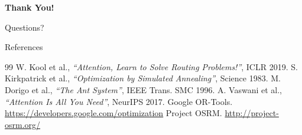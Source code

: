 \documentclass[aspectratio=169,11pt]{beamer}
\begin{document}
\begin{frame}[plain]
    \begin{center}
        \vspace{2cm}
        {\Huge\textbf{Thank You!}}

        \vspace{1cm}
        {\large Questions?}
    \end{center}
\end{frame}

\begin{frame}{References}
    \small
    \begin{thebibliography}{99}
         W. Kool et al., \textit{``Attention, Learn to Solve Routing Problems!''}, ICLR 2019.
         S. Kirkpatrick et al., \textit{``Optimization by Simulated Annealing''}, Science 1983.
         M. Dorigo et al., \textit{``The Ant System''}, IEEE Trans. SMC 1996.
         A. Vaswani et al., \textit{``Attention Is All You Need''}, NeurIPS 2017.
         Google OR-Tools. \url{https://developers.google.com/optimization}
         Project OSRM. \url{http://project-osrm.org/}
    \end{thebibliography}
\end{frame}
\end{document}
